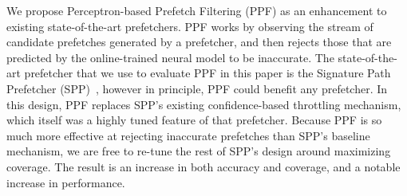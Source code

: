 

We propose Perceptron-based Prefetch Filtering (PPF) as an enhancement to
existing state-of-the-art prefetchers.  PPF works by observing the stream of
candidate prefetches generated by a prefetcher, and then rejects those that
are predicted by the online-trained neural model to be inaccurate.
The state-of-the-art prefetcher that we 
use to evaluate PPF in this paper is the Signature Path Prefetcher 
(SPP)~\cite{SPP}, however in principle, PPF could benefit any prefetcher.
In this design, PPF replaces SPP's existing confidence-based throttling mechanism,
which itself was a highly tuned feature of that prefetcher.  Because PPF is
so much more effective at rejecting inaccurate prefetches than SPP's baseline
mechanism, we are free to re-tune the rest of SPP's design around maximizing
coverage.  The result is an increase in both accuracy and coverage, and
a notable increase in performance.

